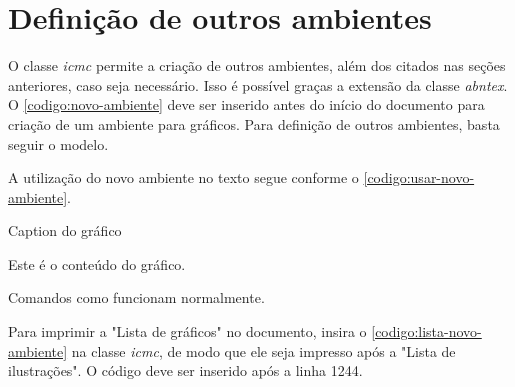 \section{Definição de outros ambientes}
\label{secao:outros-ambientes}

O classe \textit{icmc} permite a criação de outros ambientes, além dos citados nas seções anteriores, caso seja necessário. Isso é possível graças a extensão da classe \textit{abntex}. O \autoref{codigo:novo-ambiente} deve ser inserido antes do início do documento para criação de um ambiente para gráficos. Para definição de outros ambientes, basta seguir o modelo.


\begin{codigo}[caption={Definição do ambiente \textbf{grafico}}, label={codigo:novo-ambiente}, language=Tex, breaklines=true]
\makeatletter

\newcommand{\graficoname}{Gráfico}
\newcommand{\graficorefname}{Gráfico}
\newcommand{\listofgraficosname}{Lista de gráficos}

\addto\captionsenglish{%
    \newcommand{\graficoname}{Graph}
    \newcommand{\graficorefname}{Graph}
    \newcommand{\listofgraficosname}{List of graphs}
}

\newfloat[chapter]{grafico}{logr}{\graficoname}

\renewcommand{\thegrafico}{\thechapter.\@arabic\c@grafico}
\renewcommand{\cftgraficoname}{\graficoname\space}
\renewcommand*{\cftgraficoaftersnum}{\hfill\textendash\hfill}

\makeatother
\end{codigo}

A utilização do novo ambiente no texto segue conforme o \autoref{codigo:usar-novo-ambiente}.

\begin{codigo}[caption={Como usar o ambiente \textbf{grafico}}, label={codigo:usar-novo-ambiente}, language=Tex, breaklines=true]
\begin{grafico}[htb]
\caption{Caption do gráfico}
\label{gra:modelo}
Este é o conteúdo do gráfico.
\end{grafico}
\end{codigo}

Comandos como  funcionam normalmente.

Para imprimir a "Lista de gráficos" no documento, insira o \autoref{codigo:lista-novo-ambiente} na classe \textit{icmc}, de modo que ele seja impresso após a "Lista de ilustrações". O código deve ser inserido após a linha 1244.


\begin{codigo}[caption={Código para inserir lista de gráficos}, label={codigo:lista-novo-ambiente}, language=Tex, breaklines=true]
\listofgraficos*
\cleardoublepage
\end{codigo}